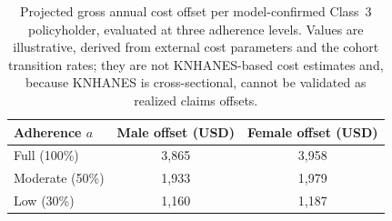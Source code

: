 \begin{table}[ht]
\centering
\caption{Projected gross annual cost offset per model-confirmed Class~3 policyholder, evaluated at three adherence levels. Values are illustrative, derived from external cost parameters and the cohort transition rates; they are not KNHANES-based cost estimates and, because KNHANES is cross-sectional, cannot be validated as realized claims offsets.}
\label{tab:cost_offset}
\begin{tabular}{lcc}
\toprule
Adherence $a$ & Male offset (USD) & Female offset (USD) \\
\midrule
  Full (100\%) & 3,865 & 3,958 \\
  Moderate (50\%) & 1,933 & 1,979 \\
  Low (30\%) & 1,160 & 1,187 \\
\bottomrule
\end{tabular}
\end{table}